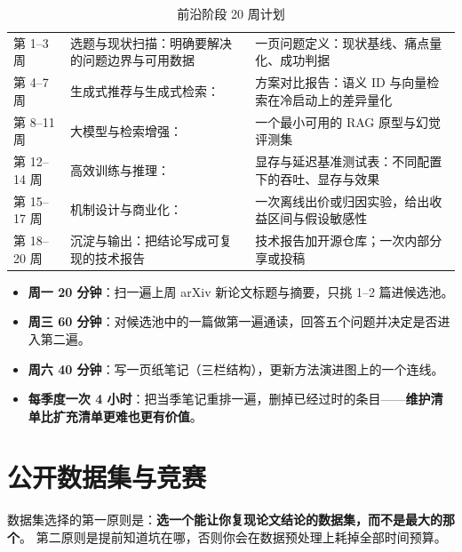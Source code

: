 \begin{table}[htbp]
\centering
\caption{前沿阶段 20 周计划}
\label{tab:plan-frontier}
\small
\begin{tabularx}{\textwidth}{L{1.6cm} L{3.4cm} Y}
\toprule
{} &  &  \\
\midrule
第 1--3 周 & 选题与现状扫描：明确要解决的问题边界与可用数据 &
一页问题定义：现状基线、痛点量化、成功判据 \\
第 4--7 周 & 生成式推荐与生成式检索：\cite{rajput2023tiger,zhai2024hstu} &
方案对比报告：语义 ID 与向量检索在冷启动上的差异量化 \\
第 8--11 周 & 大模型与检索增强：\cite{lewis2021rag,gao2023ragsurvey,ji2023hallucination} &
一个最小可用的 RAG 原型与幻觉评测集 \\
第 12--14 周 & 高效训练与推理：\cite{hu2021lora,dao2022flashattention} &
显存与延迟基准测试表：不同配置下的吞吐、显存与效果 \\
第 15--17 周 & 机制设计与商业化：\cite{varian2007position,zhang2016ocpc,shao2016attribution} &
一次离线出价或归因实验，给出收益区间与假设敏感性 \\
第 18--20 周 & 沉淀与输出：把结论写成可复现的技术报告 &
技术报告加开源仓库；一次内部分享或投稿 \\
\bottomrule
\end{tabularx}
\end{table}

\begin{toolbox}[每周两小时的可执行节奏]
\begin{itemize}
  \item \textbf{周一 20 分钟}：扫一遍上周 arXiv 新论文标题与摘要，只挑 1--2 篇进候选池。
  \item \textbf{周三 60 分钟}：对候选池中的一篇做第一遍通读，回答五个问题并决定是否进入第二遍。
  \item \textbf{周六 40 分钟}：写一页纸笔记（三栏结构），更新方法演进图上的一个连线。
  \item \textbf{每季度一次 4 小时}：把当季笔记重排一遍，删掉已经过时的条目——\textbf{维护清单比扩充清单更难也更有价值}。
\end{itemize}
\end{toolbox}

\section{公开数据集与竞赛}

数据集选择的第一原则是：\textbf{选一个能让你复现论文结论的数据集，而不是最大的那个}。
第二原则是提前知道坑在哪，否则你会在数据预处理上耗掉全部时间预算。

